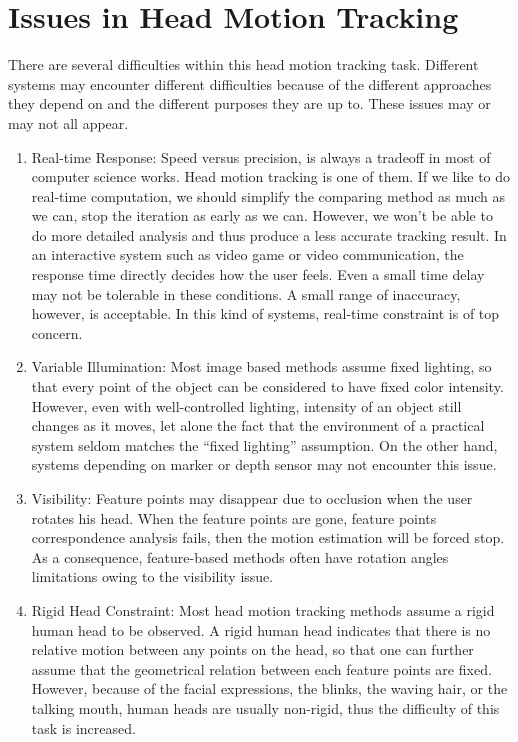 \section{Issues in Head Motion Tracking}
There are several difficulties within this head motion tracking task. Different systems may encounter different difficulties because of the different approaches they depend on and the different purposes they are up to. These issues may or may not all appear. 
\begin{enumerate}
\item Real-time Response: Speed versus precision, is always a tradeoff in most of computer science works. Head motion tracking is one of them. If we like to do real-time computation, we should simplify the comparing method as much as we can, stop the iteration as early as we can. However, we won't be able to do more detailed analysis and thus produce a less accurate tracking result. In an interactive system such as video game or video communication, the response time directly decides how the user feels. Even a small time delay may not be tolerable in these conditions. A small range of inaccuracy, however, is acceptable. In this kind of systems, real-time constraint is of top concern.
\item Variable Illumination: Most image based methods assume fixed lighting, so that every point of the object can be considered to have fixed color intensity. However, even with well-controlled lighting, intensity of an object still changes as it moves, let alone the fact that the environment of a practical system seldom matches the ``fixed lighting'' assumption. On the other hand, systems depending on marker or depth sensor may not encounter this issue.
\item Visibility: Feature points may disappear due to occlusion when the user rotates his head. When the feature points are gone, feature points correspondence analysis fails, then the motion estimation will be forced stop. As a consequence, feature-based methods often have rotation angles limitations owing to the visibility issue.
\item Rigid Head Constraint: Most head motion tracking methods assume a rigid human head to be observed. A rigid human head indicates that there is no relative motion between any points on the head, so that one can further assume that the geometrical relation between each feature points are fixed. However, because of the facial expressions, the blinks, the waving hair, or the talking mouth, human heads are usually non-rigid, thus the difficulty of this task is increased.
\end{enumerate}

